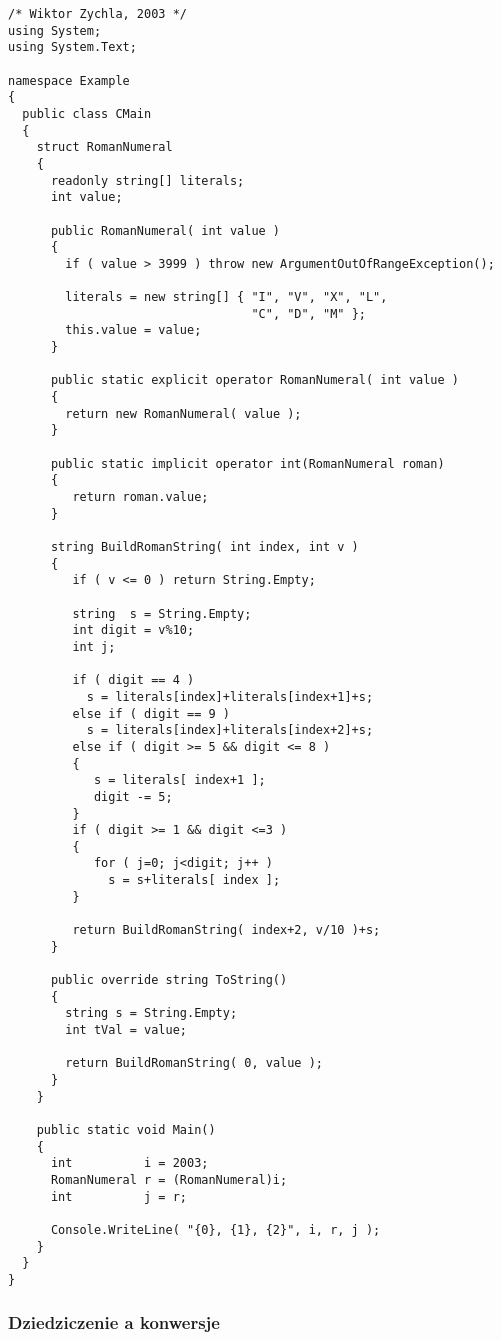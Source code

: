 \begin{scriptsize}
\begin{verbatim}
/* Wiktor Zychla, 2003 */
using System;
using System.Text;

namespace Example
{
  public class CMain
  {    
    struct RomanNumeral
    {
      readonly string[] literals;
      int value;

      public RomanNumeral( int value )
      {
        if ( value > 3999 ) throw new ArgumentOutOfRangeException();

        literals = new string[] { "I", "V", "X", "L", 
                                  "C", "D", "M" };        
        this.value = value;
      }

      public static explicit operator RomanNumeral( int value )
      {
        return new RomanNumeral( value );
      }

      public static implicit operator int(RomanNumeral roman)
      {
         return roman.value;
      }

      string BuildRomanString( int index, int v )
      {  
         if ( v <= 0 ) return String.Empty;       

         string  s = String.Empty;
         int digit = v%10;
         int j;

         if ( digit == 4 ) 
           s = literals[index]+literals[index+1]+s;
         else if ( digit == 9 ) 
           s = literals[index]+literals[index+2]+s;
         else if ( digit >= 5 && digit <= 8 )         
         {
            s = literals[ index+1 ];
            digit -= 5;
         }
         if ( digit >= 1 && digit <=3 )
         {
            for ( j=0; j<digit; j++ )
              s = s+literals[ index ];
         } 

         return BuildRomanString( index+2, v/10 )+s;
      }
    
      public override string ToString()
      {
        string s = String.Empty;
        int tVal = value;

        return BuildRomanString( 0, value );
      }
	}

    public static void Main()
    {
      int          i = 2003;
      RomanNumeral r = (RomanNumeral)i;
      int          j = r;

      Console.WriteLine( "{0}, {1}, {2}", i, r, j );
    }
  }
}
\end{verbatim}
\end{scriptsize}

\subsubsection{Dziedziczenie a konwersje}

